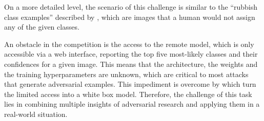 On a more detailed level, the scenario of this challenge is similar to the \enquote{rubbish class examples} described by \citet{szegedy2015explaining}, which are images that a human would not assign any of the given classes.

An obstacle in the competition is the access to the remote model, which is only accessible via a web interface,
reporting the top five most-likely classes and their confidences for a given image.
This means that the architecture, the weights and the training hyperparameters are unknown, which are critical to most attacks that generate adversarial examples.
This impediment is overcome by \citet{papernot2017practical} which turn the limited access into a white box model.
Therefore, the challenge of this task lies in combining multiple insights of adversarial research and applying them in a real-world situation.


